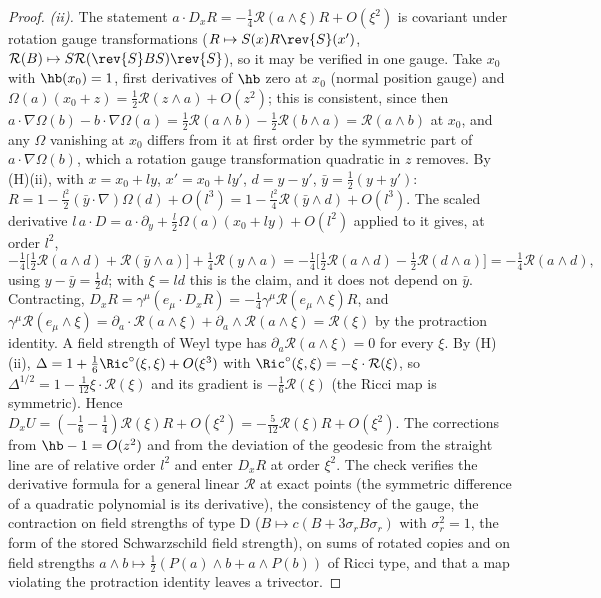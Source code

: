 \begin{proof}
\emph{(ii).} The statement $a\cdot D_{x}R = -\tfrac14\mathcal{R}(a\wedge\xi)R + O(\xi^{2})$ is covariant under rotation gauge transformations ($R \mapsto S(x)R\rev{S}(x')$, $\mathcal{R}(B) \mapsto S\mathcal{R}(\rev{S}BS)\rev{S}$), so it may be verified in one gauge. Take $x_{0}$ with $\hb(x_{0}) = 1$, first derivatives of $\hb$ zero at $x_{0}$ (normal position gauge) and $\Omega(a)(x_{0} + z) = \tfrac12\mathcal{R}(z\wedge a) + O(z^{2})$; this is consistent, since then $a\cdot\nabla\Omega(b) - b\cdot\nabla\Omega(a) = \tfrac12\mathcal{R}(a\wedge b) - \tfrac12\mathcal{R}(b\wedge a) = \mathcal{R}(a\wedge b)$ at $x_{0}$, and any $\Omega$ vanishing at $x_{0}$ differs from it at first order by the symmetric part of $a\cdot\nabla\Omega(b)$, which a rotation gauge transformation quadratic in $z$ removes. By (H)(ii), with $x = x_{0} + ly$, $x' = x_{0} + ly'$, $d = y - y'$, $\bar y = \tfrac12(y + y')$: $R = 1 - \tfrac{l^{2}}{2}(\bar y\cdot\nabla)\Omega(d) + O(l^{3}) = 1 - \tfrac{l^{2}}{4}\mathcal{R}(\bar y\wedge d) + O(l^{3})$. The scaled derivative $l\,a\cdot D = a\cdot\partial_{y} + \tfrac{l}{2}\Omega(a)(x_{0} + ly) + O(l^{2})$ applied to it gives, at order $l^{2}$,
\[
-\tfrac14\bigl[\tfrac12\mathcal{R}(a\wedge d) + \mathcal{R}(\bar y\wedge a)\bigr] + \tfrac14\mathcal{R}(y\wedge a) = -\tfrac14\bigl[\tfrac12\mathcal{R}(a\wedge d) - \tfrac12\mathcal{R}(d\wedge a)\bigr] = -\tfrac14\mathcal{R}(a\wedge d),
\]
using $y - \bar y = \tfrac12 d$; with $\xi = ld$ this is the claim, and it does not depend on $\bar y$. Contracting, $D_{x}R = \gamma^{\mu}(e_{\mu}\cdot D_{x}R) = -\tfrac14\gamma^{\mu}\mathcal{R}(e_{\mu}\wedge\xi)R$, and $\gamma^{\mu}\mathcal{R}(e_{\mu}\wedge\xi) = \partial_{a}\cdot\mathcal{R}(a\wedge\xi) + \partial_{a}\wedge\mathcal{R}(a\wedge\xi) = \mathcal{R}(\xi)$ by the protraction identity. A field strength of Weyl type has $\partial_{a}\mathcal{R}(a\wedge\xi) = 0$ for every $\xi$. By (H)(ii), $\Delta = 1 + \tfrac16\Ric^{\circ}(\xi, \xi) + O(\xi^{3})$ with $\Ric^{\circ}(\xi, \xi) = -\xi\cdot\mathcal{R}(\xi)$, so $\Delta^{1/2} = 1 - \tfrac1{12}\xi\cdot\mathcal{R}(\xi)$ and its gradient is $-\tfrac16\mathcal{R}(\xi)$ (the Ricci map is symmetric). Hence $D_{x}U = (-\tfrac16 - \tfrac14)\mathcal{R}(\xi)R + O(\xi^{2}) = -\tfrac5{12}\mathcal{R}(\xi)R + O(\xi^{2})$. The corrections from $\hb - 1 = O(z^{2})$ and from the deviation of the geodesic from the straight line are of relative order $l^{2}$ and enter $D_{x}R$ at order $\xi^{2}$. The check verifies the derivative formula for a general linear $\mathcal{R}$ at exact points (the symmetric difference of a quadratic polynomial is its derivative), the consistency of the gauge, the contraction on field strengths of type D ($B \mapsto c(B + 3\sigma_{r}B\sigma_{r})$ with $\sigma_{r}^{2} = 1$, the form of the stored Schwarzschild field strength), on sums of rotated copies and on field strengths $a\wedge b \mapsto \tfrac12(P(a)\wedge b + a\wedge P(b))$ of Ricci type, and that a map violating the protraction identity leaves a trivector.


\end{proof}
